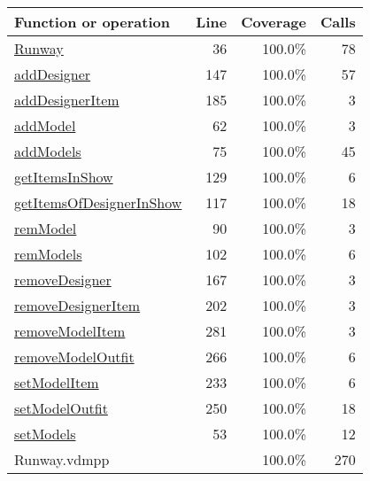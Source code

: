 \begin{longtable}{|l|r|r|r|}
\hline
Function or operation & Line & Coverage & Calls \\
\hline
\hline
\hyperref[Runway:36]{Runway} & 36&100.0\% & 78 \\
\hline
\hyperref[addDesigner:147]{addDesigner} & 147&100.0\% & 57 \\
\hline
\hyperref[addDesignerItem:185]{addDesignerItem} & 185&100.0\% & 3 \\
\hline
\hyperref[addModel:62]{addModel} & 62&100.0\% & 3 \\
\hline
\hyperref[addModels:75]{addModels} & 75&100.0\% & 45 \\
\hline
\hyperref[getItemsInShow:129]{getItemsInShow} & 129&100.0\% & 6 \\
\hline
\hyperref[getItemsOfDesignerInShow:117]{getItemsOfDesignerInShow} & 117&100.0\% & 18 \\
\hline
\hyperref[remModel:90]{remModel} & 90&100.0\% & 3 \\
\hline
\hyperref[remModels:102]{remModels} & 102&100.0\% & 6 \\
\hline
\hyperref[removeDesigner:167]{removeDesigner} & 167&100.0\% & 3 \\
\hline
\hyperref[removeDesignerItem:202]{removeDesignerItem} & 202&100.0\% & 3 \\
\hline
\hyperref[removeModelItem:281]{removeModelItem} & 281&100.0\% & 3 \\
\hline
\hyperref[removeModelOutfit:266]{removeModelOutfit} & 266&100.0\% & 6 \\
\hline
\hyperref[setModelItem:233]{setModelItem} & 233&100.0\% & 6 \\
\hline
\hyperref[setModelOutfit:250]{setModelOutfit} & 250&100.0\% & 18 \\
\hline
\hyperref[setModels:53]{setModels} & 53&100.0\% & 12 \\
\hline
\hline
Runway.vdmpp & & 100.0\% & 270 \\
\hline
\end{longtable}


